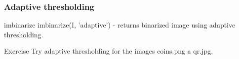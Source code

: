 \documentclass{beamer}
\begin{document}
\begin{frame}
\frametitle{Adaptive thresholding}
\begin{block}{imbinarize}
imbinarize(I, 'adaptive') - returns binarized image using adaptive thresholding.
\end{block}

\begin{block}{Exercise}
Try adaptive thresholding for the images coins.png a qr.jpg.
\end{block}
\end{frame}
\end{document}
